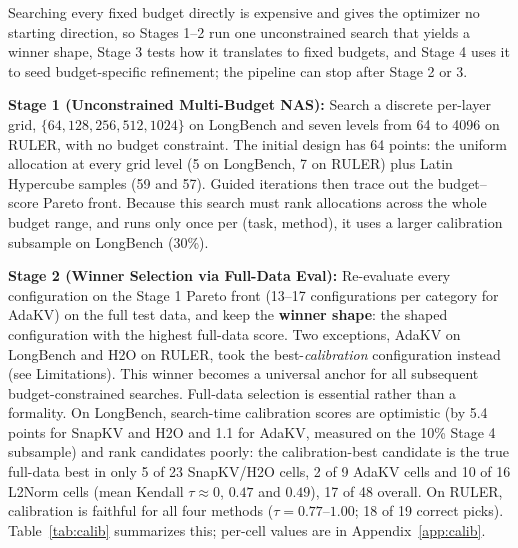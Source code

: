 \documentclass[11pt]{article}
\begin{document}
Searching every fixed budget directly is expensive and gives the optimizer no starting direction, so Stages 1--2 run one unconstrained search that yields a winner shape, Stage 3 tests how it translates to fixed budgets, and Stage 4 uses it to seed budget-specific refinement; the pipeline can stop after Stage 2 or 3.

\textbf{Stage 1 (Unconstrained Multi-Budget NAS):} Search a discrete per-layer grid, $\{64,128,256,512,1024\}$ on LongBench and seven levels from 64 to 4096 on RULER, with no budget constraint. The initial design has 64 points: the uniform allocation at every grid level (5 on LongBench, 7 on RULER) plus Latin Hypercube samples (59 and 57). Guided iterations then trace out the budget--score Pareto front. Because this search must rank allocations across the whole budget range, and runs only once per (task, method), it uses a larger calibration subsample on LongBench (30\%).

\textbf{Stage 2 (Winner Selection via Full-Data Eval):} Re-evaluate every configuration on the Stage 1 Pareto front (13--17 configurations per category for AdaKV) on the full test data, and keep the \textbf{winner shape}: the shaped configuration with the highest full-data score. Two exceptions, AdaKV on LongBench and H2O on RULER, took the best-\emph{calibration} configuration instead (see Limitations). This winner becomes a universal anchor for all subsequent budget-constrained searches. Full-data selection is essential rather than a formality. On LongBench, search-time calibration scores are optimistic (by 5.4 points for SnapKV and H2O and 1.1 for AdaKV, measured on the 10\% Stage 4 subsample) and rank candidates poorly: the calibration-best candidate is the true full-data best in only 5 of 23 SnapKV/H2O cells, 2 of 9 AdaKV cells and 10 of 16 L2Norm cells (mean Kendall $\tau \approx 0$, $0.47$ and $0.49$), 17 of 48 overall. On RULER, calibration is faithful for all four methods ($\tau = 0.77$--$1.00$; 18 of 19 correct picks). Table~\ref{tab:calib} summarizes this; per-cell values are in Appendix~\ref{app:calib}.
\end{document}
